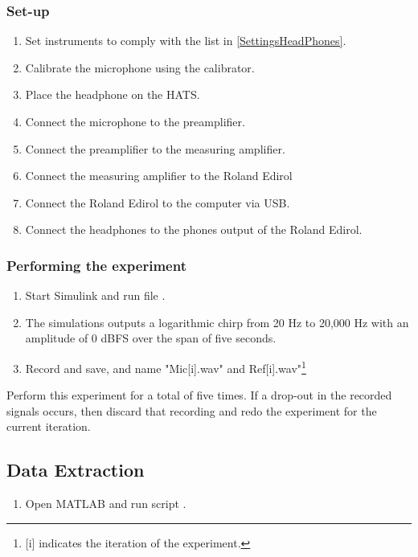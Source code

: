 \subsubsection{Set-up}
\begin{enumerate}
	\item Set instruments to comply with the list in \ref{SettingsHeadPhones}.
	\item Calibrate the microphone using the calibrator.
	\item Place the headphone on the HATS.
	\item Connect the microphone to the preamplifier. 
	\item Connect the preamplifier to the measuring amplifier.
	\item Connect the measuring amplifier to the Roland Edirol 
	\item Connect the Roland Edirol to the computer via USB.
	\item Connect the headphones to the phones output of the Roland Edirol.
\end{enumerate}

\subsubsection{Performing the experiment}
\begin{enumerate}
	\item Start Simulink and run file  .
	\item The simulations outputs a logarithmic chirp from 20 Hz to 20,000 Hz with an amplitude of 0 dBFS over the span of five seconds.
	\item Record and save, and name "Mic[i].wav" and Ref[i].wav"\footnote{[i] indicates the iteration of the experiment.}
\end{enumerate}
Perform this experiment for a total of five times.
If  a drop-out in the recorded signals occurs, then discard that recording and redo the experiment for the current iteration.

\subsection{Data Extraction}
\begin{enumerate}
	\item Open MATLAB and run script .
\end{enumerate}

